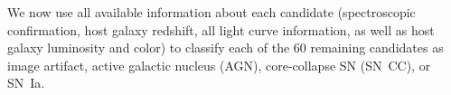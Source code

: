 
We now use all available information about each candidate
(spectroscopic confirmation, host galaxy redshift, all light curve
information, as well as host galaxy luminosity and color) to classify
each of the 60 remaining candidates as image artifact, active galactic
nucleus (AGN), core-collapse SN (SN~CC), or SN~Ia.

